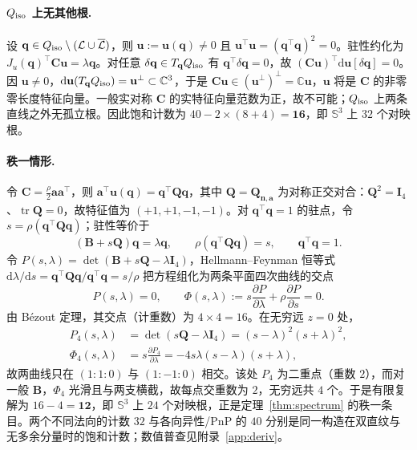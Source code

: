 \paragraph{$Q_{\rm iso}$ 上无其他根.} 设 $\mathbf q\in Q_{\rm iso}\setminus(\mathcal L\cup\overline{\mathcal L})$，则 $\mathbf u:=\mathbf u(\mathbf q)\ne0$ 且 $\mathbf u^\top\mathbf u=(\mathbf q^\top\mathbf q)^2=0$。驻性约化为 $J_u(\mathbf q)^\top\mathbf C\mathbf u=\lambda\mathbf q$。对任意 $\delta\mathbf q\in T_{\mathbf q}Q_{\rm iso}$ 有 $\mathbf q^\top\delta\mathbf q=0$，故 $(\mathbf C\mathbf u)^\top\mathrm d\mathbf u[\delta\mathbf q]=0$。因 $\mathbf u\ne0$，$\mathrm d\mathbf u(T_{\mathbf q}Q_{\rm iso})=\mathbf u^\perp\subset\mathbb C^3$，于是 $\mathbf C\mathbf u\in(\mathbf u^\perp)^\perp=\mathbb C\mathbf u$，$\mathbf u$ 将是 $\mathbf C$ 的非零零长度特征向量。一般实对称 $\mathbf C$ 的实特征向量范数为正，故不可能；$Q_{\rm iso}$ 上两条直线之外无孤立根。因此饱和计数为 $40-2\times(8+4)=\mathbf{16}$，即 $\mathbb S^3$ 上 $32$ 个对映根。

\paragraph{秩一情形.} 令 $\mathbf C=\tfrac{\rho}{2}\mathbf a\mathbf a^\top$，则 $\mathbf a^\top\mathbf u(\mathbf q)=\mathbf q^\top\mathbf Q\mathbf q$，其中 $\mathbf Q=\mathbf Q_{\mathbf n,\mathbf a}$ 为对称正交对合：$\mathbf Q^2=\mathbf I_4$、$\operatorname{tr}\mathbf Q=0$，故特征值为 $(+1,+1,-1,-1)$。对 $\mathbf q^\top\mathbf q=1$ 的驻点，令 $s=\rho(\mathbf q^\top\mathbf Q\mathbf q)$；驻性等价于
\begin{equation}
(\mathbf B+s\mathbf Q)\mathbf q=\lambda\mathbf q,\qquad \rho(\mathbf q^\top\mathbf Q\mathbf q)=s,\qquad \mathbf q^\top\mathbf q=1 .
\end{equation}
令 $P(s,\lambda)=\det(\mathbf B+s\mathbf Q-\lambda\mathbf I_4)$，Hellmann--Feynman 恒等式 $\mathrm d\lambda/\mathrm ds=\mathbf q^\top\mathbf Q\mathbf q/\mathbf q^\top\mathbf q=s/\rho$ 把方程组化为两条平面四次曲线的交点
\begin{equation}
P(s,\lambda)=0,\qquad \Phi(s,\lambda):=s\frac{\partial P}{\partial\lambda}+\rho\frac{\partial P}{\partial s}=0 .
\end{equation}
由 Bézout 定理，其交点（计重数）为 $4\times4=16$。在无穷远 $z=0$ 处，
\begin{equation}
\begin{aligned}
P_4(s,\lambda)&=\det(s\mathbf Q-\lambda\mathbf I_4)=(s-\lambda)^2(s+\lambda)^2,\\
\Phi_4(s,\lambda)&=s\frac{\partial P_4}{\partial\lambda}=-4s\lambda(s-\lambda)(s+\lambda),
\end{aligned}
\end{equation}
故两曲线只在 $(1:1:0)$ 与 $(1:-1:0)$ 相交。该处 $P_4$ 为二重点（重数 $2$），而对一般 $\mathbf B$，$\Phi_4$ 光滑且与两支横截，故每点交重数为 $2$，无穷远共 $4$ 个。于是有限复解为 $16-4=\mathbf{12}$，即 $\mathbb S^3$ 上 $24$ 个对映根，正是定理~\ref{thm:spectrum} 的秩一条目。两个不同法向的计数 $32$ 与各向异性/PnP 的 $40$ 分别是同一构造在双直纹与无多余分量时的饱和计数；数值普查见附录~\ref{app:deriv}。

